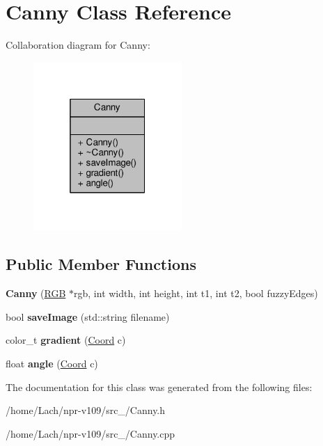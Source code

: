 \hypertarget{classCanny}{}\section{Canny Class Reference}
\label{classCanny}


Collaboration diagram for Canny\+:
\nopagebreak
\begin{figure}[H]
\begin{center}
\leavevmode
\includegraphics[width=160pt]{classCanny__coll__graph}
\end{center}
\end{figure}
\subsection*{Public Member Functions}
\begin{DoxyCompactItemize}
\item 
\hypertarget{classCanny_a1ad410465ac8ce1297e2b2da3af251a4}{}\label{classCanny_a1ad410465ac8ce1297e2b2da3af251a4} 
{\bfseries Canny} (\hyperlink{structRGB}{R\+GB} $\ast$rgb, int width, int height, int t1, int t2, bool fuzzy\+Edges)
\item 
\hypertarget{classCanny_ae55fb997a745394d6a458ff2614d96bc}{}\label{classCanny_ae55fb997a745394d6a458ff2614d96bc} 
bool {\bfseries save\+Image} (std\+::string filename)
\item 
\hypertarget{classCanny_a8ed16206ee4a1e2b83bc044c6ea44edf}{}\label{classCanny_a8ed16206ee4a1e2b83bc044c6ea44edf} 
color\+\_\+t {\bfseries gradient} (\hyperlink{structCoord}{Coord} c)
\item 
\hypertarget{classCanny_ad772d59de68ce90791123e51f32b76d8}{}\label{classCanny_ad772d59de68ce90791123e51f32b76d8} 
float {\bfseries angle} (\hyperlink{structCoord}{Coord} c)
\end{DoxyCompactItemize}


The documentation for this class was generated from the following files\+:\begin{DoxyCompactItemize}
\item 
/home/\+Lach/npr-\/v109/src\+\_/Canny.\+h\item 
/home/\+Lach/npr-\/v109/src\+\_/Canny.\+cpp\end{DoxyCompactItemize}
